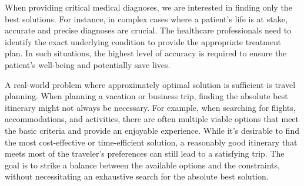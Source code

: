 When providing critical medical diagnoses, we are interested in finding only the best solutions.
For instance, in complex cases where a patient's life is at stake, accurate and precise diagnoses are crucial.
The healthcare professionals need to identify the exact underlying condition to provide the appropriate treatment plan.
In such situations, the highest level of accuracy is required to ensure the patient's well-being and potentially save lives.

A real-world problem where approximately optimal solution is sufficient is travel planning.
When planning a vacation or business trip, finding the absolute best itinerary might not always be necessary.
For example, when searching for flights, accommodations, and activities, there are often multiple viable options that meet the basic criteria and provide an enjoyable experience.
While it's desirable to find the most cost-effective or time-efficient solution, a reasonably good itinerary that meets most of the traveler's preferences can still lead to a satisfying trip.
The goal is to strike a balance between the available options and the constraints, without necessitating an exhaustive search for the absolute best solution.
